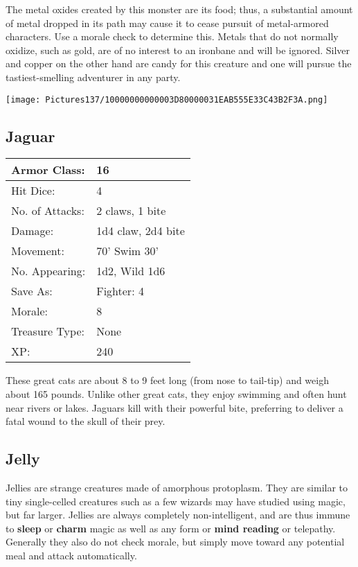 \documentclass[a4paper,twoside,openany,10pt]{book}
\begin{document}
\begin{multicols}{2}
The metal oxides created by this monster are its food; thus, a substantial amount of metal dropped in its path may cause it to cease pursuit of metal-armored characters. Use a morale check to determine this.  Metals that do not normally oxidize, such as gold, are of no interest to an ironbane and will be ignored. Silver and copper on the other hand are candy for this creature and one will pursue the tastiest-smelling adventurer in any party.


\begin{center}
	\texttt{[image: Pictures137/10000000000003D80000031EAB555E33C43B2F3A.png]}
\end{center}


\subsection*{Jaguar}\label{jaguar}

\begin{tabularx}{0.50\textwidth}{@{}lX@{}}
Armor Class: & 16 \\\hline
Hit Dice: & 4 \\\hline
No. of Attacks: & 2 claws, 1 bite \\\hline
Damage: & 1d4 claw, 2d4 bite \\\hline
Movement: & 70' Swim 30' \\\hline
No. Appearing: & 1d2, Wild 1d6 \\\hline
Save As: & Fighter: 4 \\\hline
Morale: & 8 \\\hline
Treasure Type: & None \\\hline
XP: & 240 \\\hline
\end{tabularx}\medskip

These great cats are about 8 to 9 feet long (from nose to tail-tip) and weigh about 165 pounds. Unlike other great cats, they enjoy swimming and often hunt near rivers or lakes. Jaguars kill with their powerful bite, preferring to deliver a fatal wound to the skull of their prey. 

\subsection*{Jelly}\label{jelly}

Jellies are strange creatures made of amorphous protoplasm. They are similar to tiny single-celled creatures such as a few wizards may have studied using magic, but far larger. Jellies are always completely non-intelligent, and are thus immune to \textbf{sleep }or \textbf{charm }magic as well as any form or \textbf{mind reading }or telepathy. Generally they also do not check morale, but simply move toward any potential meal and attack automatically.


\end{multicols}
\end{document}
